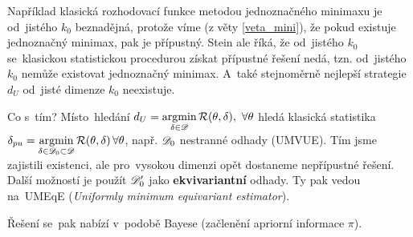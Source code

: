 \begin{dusl}
	Například klasická rozhodovací funkce metodou jednoznačného minimaxu je od~jistého $k_0$ beznadějná, protože víme (z věty \ref{veta_mini}), že pokud existuje jednoznačný minimax, pak je přípustný. Stein ale říká, že od~jistého $k_0$ se~klasickou statistickou procedurou získat přípustné řešení nedá, tzn. od~jistého $k_0$ nemůže existovat jednoznačný minimax. A~také stejnoměrně nejlepší strategie $d_U$ od~jisté dimenze $k_0$ neexistuje.
\end{dusl}
Co s~tím? Místo~hledání $d_U=\mathop{\mathrm{argmin}}\limits_{\delta\in\mathscr{D} }\mathcal{R}(\theta,\delta),~\forall\theta$ hledá klasická statistika $\delta_{pu}=\mathop{\mathrm{argmin}}\limits_{\delta\in\mathscr{D} _0\subset\mathscr{D} }\mathcal{R}(\theta,\delta)\,\forall\theta$, např. $\mathscr{D} _0$ nestranné odhady (UMVUE). Tím jsme zajistili existenci, ale pro~vysokou dimenzi opět dostaneme nepřípustné řešení. Další možností je použít $\mathscr{D} _0'$ jako \textbf{ekvivariantní} odhady. Ty pak vedou na~UMEqE (\textit{Uniformly minimum equivariant estimator}).  

Řešení se~pak nabízí v~podobě Bayese (začlenění apriorní informace $\pi$).
